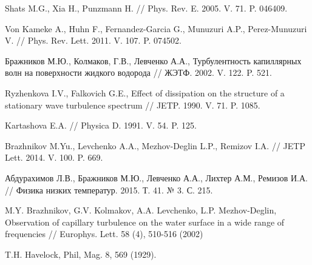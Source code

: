 \begin{thebibliography}{99}
Shats M.G., Xia H., Punzmann H. // Phys. Rev. E. 2005. V. 71. P. 046409.

Von Kameke A., Huhn F., Fernandez-Garcia G., Munuzuri A.P., Perez-Munuzuri V. // Phys. Rev. Lett. 2011. V. 107. P. 074502.



Бражников М.Ю., Колмаков, Г.В., Левченко А.А., Турбулентность капиллярных волн на поверхности жидкого водорода // ЖЭТФ. 2002. V. 122. P. 521.

Ryzhenkova I.V., Falkovich G.E., Effect of dissipation on the structure of a stationary wave turbulence spectrum // JETP. 1990. V. 71. P. 1085.



Kartashova E.A. // Physica D. 1991. V. 54. P. 125.

Brazhnikov M.Yu., Levchenko A.A., Mezhov-Deglin L.P., Remizov I.A. // JETP Lett. 2014. V. 100. P. 669.

Абдурахимов Л.В., Бражников М.Ю., Левченко А.А., Лихтер А.М., Ремизов И.А. // Физика низких температур. 2015. Т. 41. № 3. С. 215.


M.Y. Brazhnikov, G.V. Kolmakov, A.A. Levchenko, L.P. Mezhov-Deglin, Observation of capillary turbulence on the water surface in a wide range of frequencies // Europhys. Lett. 58 (4), 510-516 (2002)


T.H. Havelock, Phil, Mag. 8, 569 (1929).


\end{thebibliography}
